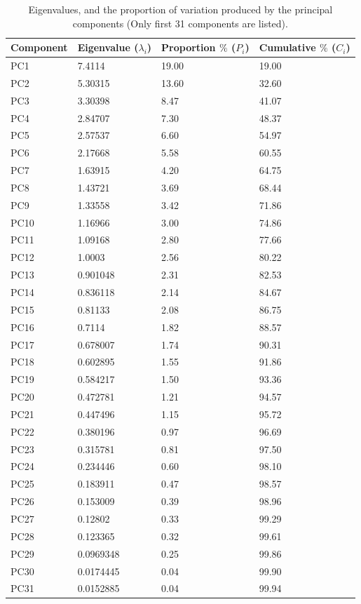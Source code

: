 \begin{table}[]
\begin{tabular}{|l|l|l|l|}
\hline
\textbf{Component} & \textbf{Eigenvalue ($\lambda_i$)} & \textbf{Proportion $\%$ ($P_i$)} & \textbf{Cumulative $\%$} ($C_i$) \\ \hline
PC1 & 7.4114 & 19.00 & 19.00 \\ \hline
PC2 & 5.30315 & 13.60 & 32.60 \\ \hline
PC3 & 3.30398 & 8.47 & 41.07 \\ \hline
PC4 & 2.84707 & 7.30 & 48.37 \\ \hline
PC5 & 2.57537 & 6.60 & 54.97 \\ \hline
PC6 & 2.17668 & 5.58 & 60.55 \\ \hline
PC7 & 1.63915 & 4.20 & 64.75 \\ \hline
PC8 & 1.43721 & 3.69 & 68.44 \\ \hline
PC9 & 1.33558 & 3.42 & 71.86 \\ \hline
PC10 & 1.16966 & 3.00 & 74.86 \\ \hline
PC11 & 1.09168 & 2.80 & 77.66 \\ \hline
PC12 & 1.0003 & 2.56 & 80.22 \\ \hline
PC13 & 0.901048 & 2.31 & 82.53 \\ \hline
PC14 & 0.836118 & 2.14 & 84.67 \\ \hline
PC15 & 0.81133 & 2.08 & 86.75 \\ \hline
PC16 & 0.7114 & 1.82 & 88.57 \\ \hline
PC17 & 0.678007 & 1.74 & 90.31 \\ \hline
PC18 & 0.602895 & 1.55 & 91.86 \\ \hline
PC19 & 0.584217 & 1.50 & 93.36 \\ \hline
PC20 & 0.472781 & 1.21 & 94.57 \\ \hline
PC21 & 0.447496 & 1.15 & 95.72 \\ \hline
PC22 & 0.380196 & 0.97 & 96.69 \\ \hline
PC23 & 0.315781 & 0.81 & 97.50 \\ \hline
PC24 & 0.234446 & 0.60 & 98.10 \\ \hline
PC25 & 0.183911 & 0.47 & 98.57 \\ \hline
PC26 & 0.153009 & 0.39 & 98.96 \\ \hline
PC27 & 0.12802 & 0.33 & 99.29 \\ \hline
PC28 & 0.123365 & 0.32 & 99.61 \\ \hline
PC29 & 0.0969348 & 0.25 & 99.86 \\ \hline
PC30 & 0.0174445 & 0.04 & 99.90 \\ \hline
PC31 & 0.0152885 & 0.04 & 99.94 \\ \hline
\end{tabular}
\caption{Eigenvalues, and the proportion of variation produced by the principal components (Only first 31 components are listed).}
\label{tbl:pca}
\end{table}


